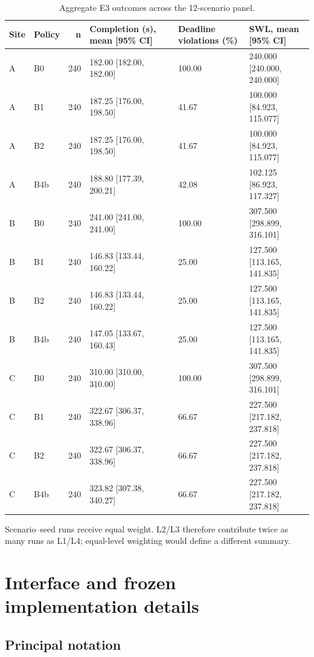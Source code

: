 \documentclass[11pt,a4paper]{article}
\begin{document}
\begin{table}[H]
\centering
\small
\setlength{\tabcolsep}{3pt}
\caption{Aggregate E3 outcomes across the 12-scenario panel.}
\label{tab:S7}
\begin{tabularx}{\textwidth}{@{}llrYYY@{}}
\toprule
Site & Policy & n & Completion (s), mean [95\% CI] & Deadline violations (\%) & SWL, mean [95\% CI] \\
\midrule
A & B0 & 240 & 182.00 [182.00, 182.00] & 100.00 & 240.000 [240.000, 240.000] \\
A & B1 & 240 & 187.25 [176.00, 198.50] & 41.67 & 100.000 [84.923, 115.077] \\
A & B2 & 240 & 187.25 [176.00, 198.50] & 41.67 & 100.000 [84.923, 115.077] \\
A & B4b & 240 & 188.80 [177.39, 200.21] & 42.08 & 102.125 [86.923, 117.327] \\
B & B0 & 240 & 241.00 [241.00, 241.00] & 100.00 & 307.500 [298.899, 316.101] \\
B & B1 & 240 & 146.83 [133.44, 160.22] & 25.00 & 127.500 [113.165, 141.835] \\
B & B2 & 240 & 146.83 [133.44, 160.22] & 25.00 & 127.500 [113.165, 141.835] \\
B & B4b & 240 & 147.05 [133.67, 160.43] & 25.00 & 127.500 [113.165, 141.835] \\
C & B0 & 240 & 310.00 [310.00, 310.00] & 100.00 & 307.500 [298.899, 316.101] \\
C & B1 & 240 & 322.67 [306.37, 338.96] & 66.67 & 227.500 [217.182, 237.818] \\
C & B2 & 240 & 322.67 [306.37, 338.96] & 66.67 & 227.500 [217.182, 237.818] \\
C & B4b & 240 & 323.82 [307.38, 340.27] & 66.67 & 227.500 [217.182, 237.818] \\
\bottomrule
\end{tabularx}
\end{table}

Scenario--seed runs receive equal weight. L2/L3 therefore contribute twice as many runs as L1/L4; equal-level weighting would define a different summary.

\section{Interface and frozen implementation details}

\subsection{Principal notation}
\end{document}
